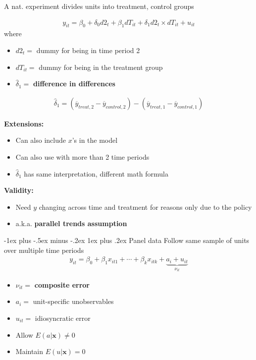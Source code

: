 \documentclass[10pt,landscape]{article}
\makeatletter
\renewcommand{\subsubsection}{\@startsection{subsubsection}{3}{0mm}%
                                {-1ex plus -.5ex minus -.2ex}%
                                {1ex plus .2ex}%
                                {\normalfont\small\bfseries}}
\makeatother
\begin{document}
\begin{multicols}{3}
\medskip{}

A nat. experiment divides units into treatment, control groups

\begin{align*}
    y_{it} = \beta_0 + \delta_0 d2_t + \beta_1 dT_{it} + \delta_1 d2_{t}\times dT_{it} + u_{it}
\end{align*}
where
\begin{itemize}
    \item $d2_t=$ dummy for being in time period 2
    \item $dT_{it}=$ dummy for being in the treatment group
    \item $\hat{\delta}_1=$ \textbf{difference in differences}
\end{itemize}
\begin{align*}
    \hat{\delta}_1 = \left(\overline{y}_{treat,2}-\overline{y}_{control,2}\right) - \left(\overline{y}_{treat,1}-\overline{y}_{control,1}\right)
\end{align*}

\medskip{}


\textbf{Extensions:}
\begin{itemize}
    \item Can also include $x$'s in the model
    \item Can also use with more than 2 time periods
    \item $\hat{\delta}_1$ has same interpretation, different math formula
\end{itemize}

\medskip{}

\textbf{Validity:}
\begin{itemize}
    \item Need $y$ changing across time and treatment for reasons only due to the policy
    \item a.k.a. \textbf{parallel trends assumption}
\end{itemize}


\subsubsection{Panel data}
Follow same sample of units over multiple time periods
\begin{align*}
    y_{it} = \beta_0 + \beta_1 x_{it1} + \cdots + \beta_k x_{itk} + \underbrace{a_i + u_{it}}_{\nu_{it}}
\end{align*}
\begin{itemize}
    \item $\nu_{it}=$ \textbf{composite error}
    \item $a_i=$  unit-specific unobservables
    \item $u_{it}=$ idiosyncratic error
    \item Allow $E\left(a\vert\mathbf{x}\right)\neq 0$
    \item Maintain $E\left(u\vert\mathbf{x}\right)= 0$
\end{itemize}


\end{multicols}
\end{document}
